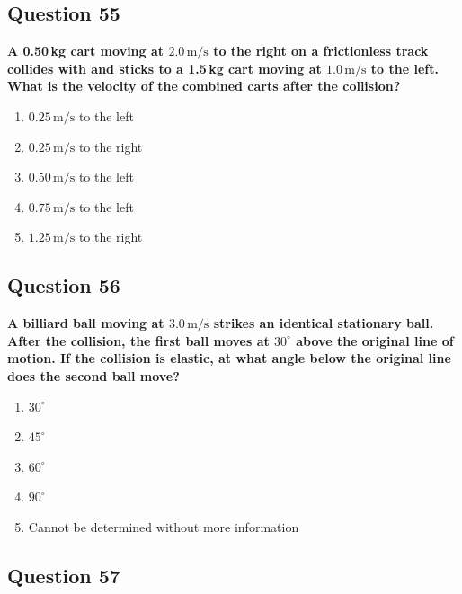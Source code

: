 \documentclass[12pt,letterpaper]{article}
\begin{document}
\subsection{Question 55}

\begin{questionbox}
\textbf{A 0.50\,kg cart moving at $2.0\,\text{m/s}$ to the right on a frictionless track collides with and sticks to a 1.5\,kg cart moving at $1.0\,\text{m/s}$ to the left. What is the velocity of the combined carts after the collision?}

\begin{enumerate}[label=\alph*)]
    \item $0.25\,\text{m/s}$ to the left
    \item $0.25\,\text{m/s}$ to the right
    \item $0.50\,\text{m/s}$ to the left
    \item $0.75\,\text{m/s}$ to the left
    \item $1.25\,\text{m/s}$ to the right
\end{enumerate}
\end{questionbox}

\subsection{Question 56}

\begin{questionbox}
\textbf{A billiard ball moving at $3.0\,\text{m/s}$ strikes an identical stationary ball. After the collision, the first ball moves at $30^\circ$ above the original line of motion. If the collision is elastic, at what angle below the original line does the second ball move?}

\begin{enumerate}[label=\alph*)]
    \item $30^\circ$
    \item $45^\circ$
    \item $60^\circ$
    \item $90^\circ$
    \item Cannot be determined without more information
\end{enumerate}
\end{questionbox}

\subsection{Question 57}
\end{document}
